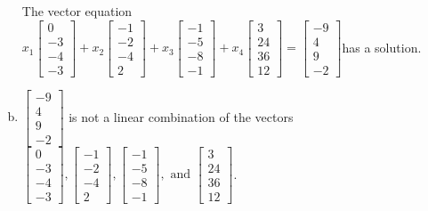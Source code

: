 \begin{exerciseAnswer}
\begin{enumerate}[(a)]
\begin{center}
\begin{minipage}{0.8\textwidth}
 The vector equation \( x_{1} \left[\begin{array}{c}
0 \\
-3 \\
-4 \\
-3
\end{array}\right] + x_{2} \left[\begin{array}{c}
-1 \\
-2 \\
-4 \\
2
\end{array}\right] + x_{3} \left[\begin{array}{c}
-1 \\
-5 \\
-8 \\
-1
\end{array}\right] + x_{4} \left[\begin{array}{c}
3 \\
24 \\
36 \\
12
\end{array}\right] = \left[\begin{array}{c}
-9 \\
4 \\
9 \\
-2
\end{array}\right] \)has a solution.
\end{minipage}\end{center}
    
\item 

\( \left[\begin{array}{c}
-9 \\
4 \\
9 \\
-2
\end{array}\right] \) is not a linear combination of the vectors \( \left[\begin{array}{c}
0 \\
-3 \\
-4 \\
-3
\end{array}\right] , \left[\begin{array}{c}
-1 \\
-2 \\
-4 \\
2
\end{array}\right] , \left[\begin{array}{c}
-1 \\
-5 \\
-8 \\
-1
\end{array}\right] , \text{ and } \left[\begin{array}{c}
3 \\
24 \\
36 \\
12
\end{array}\right] \). 


\end{enumerate}
    
\end{exerciseAnswer}
    
